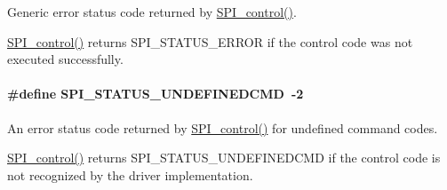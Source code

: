 Generic error status code returned by \hyperlink{_s_p_i_8h_ab9d3a23991be2741f382749d3844cc2f}{S\+P\+I\+\_\+control()}. 

\hyperlink{_s_p_i_8h_ab9d3a23991be2741f382749d3844cc2f}{S\+P\+I\+\_\+control()} returns S\+P\+I\+\_\+\+S\+T\+A\+T\+U\+S\+\_\+\+E\+R\+R\+O\+R if the control code was not executed successfully. 
\paragraph[{S\+P\+I\+\_\+\+S\+T\+A\+T\+U\+S\+\_\+\+U\+N\+D\+E\+F\+I\+N\+E\+D\+C\+M\+D}]{\setlength{\rightskip}{0pt plus 5cm}\#define S\+P\+I\+\_\+\+S\+T\+A\+T\+U\+S\+\_\+\+U\+N\+D\+E\+F\+I\+N\+E\+D\+C\+M\+D~-\/2}\label{group___s_p_i___s_t_a_t_u_s_gacfcd15e1eecdb99b4867adc7592a8d6e}


An error status code returned by \hyperlink{_s_p_i_8h_ab9d3a23991be2741f382749d3844cc2f}{S\+P\+I\+\_\+control()} for undefined command codes. 

\hyperlink{_s_p_i_8h_ab9d3a23991be2741f382749d3844cc2f}{S\+P\+I\+\_\+control()} returns S\+P\+I\+\_\+\+S\+T\+A\+T\+U\+S\+\_\+\+U\+N\+D\+E\+F\+I\+N\+E\+D\+C\+M\+D if the control code is not recognized by the driver implementation. 